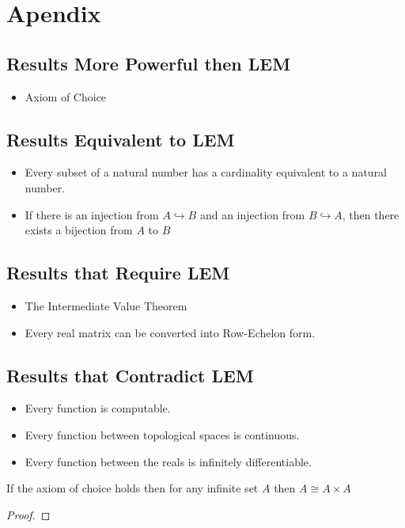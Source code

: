 
\chapter{Apendix}



\section{Results More Powerful then LEM}
\begin{itemize}
    \item Axiom of Choice
\end{itemize}

\section{Results Equivalent to LEM}
\begin{itemize}
    \item Every subset of a natural number has a cardinality equivalent to a natural number.
    \item If there is an injection from $A \hookrightarrow B$ and an injection from $B \hookrightarrow A$, then there exists a bijection from $A$ to $B$
\end{itemize}
\section{Results that Require LEM}
\begin{itemize}
    \item The Intermediate Value Theorem
    \item Every real matrix can be converted into Row-Echelon form.
    
    
\end{itemize}

\section{Results that Contradict LEM}
\begin{itemize}
    \item Every function is computable.
    \item Every function between topological spaces is continuous.
    \item Every function between the reals is infinitely differentiable.
    
\end{itemize}

\begin{theorem}
    If the axiom of choice holds then for any infinite set $A$ then $A \cong A \times A$
\end{theorem}
\begin{proof}
    
\end{proof}

